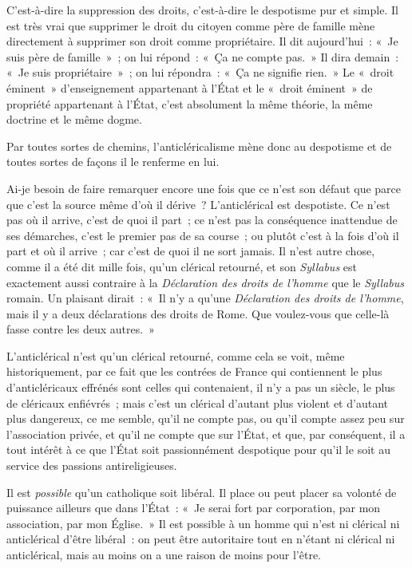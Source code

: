 \documentclass[french,twoside]{book} %
\begin{document}
\noindent  C’est-à-dire la suppression des droits, c’est-à-dire le despotisme pur et simple. Il est très vrai que supprimer le droit du citoyen comme père de famille mène directement à supprimer son droit comme propriétaire. Il dit aujourd’hui : « Je suis père de famille » ; on lui répond : « Ça ne compte pas. » Il dira demain : « Je suis propriétaire » ; on lui répondra : « Ça ne signifie rien. » Le « droit éminent » d’enseignement appartenant à l’État et le « droit éminent » de propriété appartenant à l’État, c’est absolument la même théorie, la même doctrine et le même dogme.\par
Par toutes sortes de chemins, l’anticléricalisme mène donc au despotisme et de toutes sortes de façons il le renferme en lui.\par
Ai-je besoin de faire remarquer encore une fois que ce n’est son défaut que parce que c’est la source même d’où il dérive ? L’anticlérical est despotiste. Ce n’est pas où il arrive, c’est de quoi il part ; ce n’est pas la conséquence inattendue de ses démarches, c’est le premier pas de sa course ; ou plutôt c’est à la fois d’où il part et où il arrive ; car c’est de quoi il ne sort jamais. Il n’est autre chose, comme il a été dit mille fois, qu’un clérical retourné, et son \emph{Syllabus} est exactement aussi contraire à la \emph{Déclaration des droits de l’homme} que le \emph{Syllabus} romain. Un plaisant dirait : « Il n’y a  qu’une \emph{Déclaration des droits de l’homme}, mais il y a deux déclarations des droits de Rome. Que voulez-vous que celle-là fasse contre les deux autres. »\par
L’anticlérical n’est qu’un clérical retourné, comme cela se voit, même historiquement, par ce fait que les contrées de France qui contiennent le plus d’anticléricaux effrénés sont celles qui contenaient, il n’y a pas un siècle, le plus de cléricaux enfiévrés ; mais c’est un clérical d’autant plus violent et d’autant plus dangereux, ce me semble, qu’il ne compte pas, ou qu’il compte assez peu sur l’association privée, et qu’il ne compte que sur l’État, et que, par conséquent, il a tout intérêt à ce que l’État soit passionnément despotique pour qu’il le soit au service des passions antireligieuses.\par
Il est {\itshape possible} qu’un catholique soit libéral. Il place ou peut placer sa volonté de puissance ailleurs que dans l’État : « Je serai fort par corporation, par mon association, par mon Église. » Il est possible à un homme qui n’est ni clérical ni anticlérical d’être libéral : on peut être autoritaire tout en n’étant ni clérical ni anticlérical, mais au moins on a une raison de moins pour l’être.\par
\end{document}
